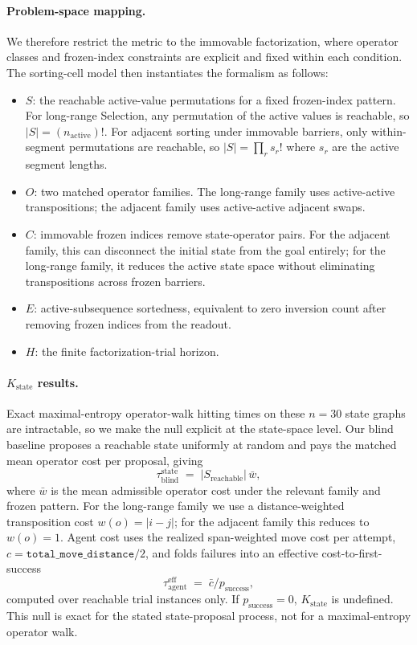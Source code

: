 \documentclass[11pt]{article}
\begin{document}
\paragraph{Problem-space mapping.}
We therefore restrict the metric to the immovable
factorization, where operator classes and frozen-index constraints are explicit and fixed within
each condition. The sorting-cell model then instantiates the formalism as follows:
\begin{itemize}
  \item $S$: the reachable active-value permutations for a fixed frozen-index pattern.
  For long-range Selection, any permutation of the active values is reachable, so
  $|S| = (n_{\text{active}})!$. For adjacent sorting under immovable barriers, only within-segment
  permutations are reachable, so $|S| = \prod_r s_r!$ where $s_r$ are the active segment lengths.
  \item $O$: two matched operator families. The long-range family uses active-active transpositions;
  the adjacent family uses active-active adjacent swaps.
  \item $C$: immovable frozen indices remove state-operator pairs. For the adjacent family, this
  can disconnect the initial state from the goal entirely; for the long-range family, it reduces
  the active state space without eliminating transpositions across frozen barriers.
  \item $E$: active-subsequence sortedness, equivalent to zero inversion count after removing frozen
  indices from the readout.
  \item $H$: the finite factorization-trial horizon.
\end{itemize}

\paragraph{$K_{\mathrm{state}}$ results.}
Exact maximal-entropy operator-walk hitting times on these $n=30$ state graphs are intractable, so
we make the null explicit at the state-space level. Our blind baseline proposes a reachable state
uniformly at random and pays the matched mean operator cost per proposal, giving
\[
\tau_{\text{blind}}^{\text{state}} \;=\; |S_{\text{reachable}}| \,\bar{w},
\]
where $\bar{w}$ is the mean admissible operator cost under the relevant family and frozen pattern.
For the long-range family we use a distance-weighted transposition cost $w(o)=|i-j|$; for the
adjacent family this reduces to $w(o)=1$. Agent cost uses the realized span-weighted move cost per
attempt, $c = \texttt{total\_move\_distance}/2$, and folds failures into an effective cost-to-first-
success
\[
\tau_{\text{agent}}^{\text{eff}} \;=\; \bar{c}/p_{\text{success}},
\]
computed over reachable trial instances only. If $p_{\text{success}} = 0$, $K_{\mathrm{state}}$ is undefined.
This null is exact for the stated state-proposal process, not for a maximal-entropy operator walk.
\end{document}
